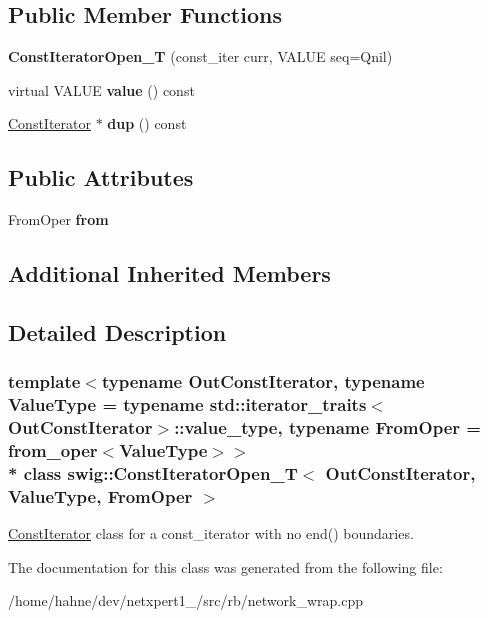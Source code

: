 \subsection*{Public Member Functions}
\begin{DoxyCompactItemize}
\item 
{\bfseries Const\+Iterator\+Open\+\_\+T} (const\+\_\+iter curr, V\+A\+L\+UE seq=Qnil)\hypertarget{classswig_1_1ConstIteratorOpen__T_a795c4ea10910b8ddd7d49113358b32b8}{}\label{classswig_1_1ConstIteratorOpen__T_a795c4ea10910b8ddd7d49113358b32b8}

\item 
virtual V\+A\+L\+UE {\bfseries value} () const \hypertarget{classswig_1_1ConstIteratorOpen__T_a56768ecfa74334e72f3acbb9b3e5b841}{}\label{classswig_1_1ConstIteratorOpen__T_a56768ecfa74334e72f3acbb9b3e5b841}

\item 
\hyperlink{structswig_1_1ConstIterator}{Const\+Iterator} $\ast$ {\bfseries dup} () const \hypertarget{classswig_1_1ConstIteratorOpen__T_abb8d229e1a739d4063e9e05a3f0df867}{}\label{classswig_1_1ConstIteratorOpen__T_abb8d229e1a739d4063e9e05a3f0df867}

\end{DoxyCompactItemize}
\subsection*{Public Attributes}
\begin{DoxyCompactItemize}
\item 
From\+Oper {\bfseries from}\hypertarget{classswig_1_1ConstIteratorOpen__T_ac5a104ae23e4a07d7fc86e4634d97735}{}\label{classswig_1_1ConstIteratorOpen__T_ac5a104ae23e4a07d7fc86e4634d97735}

\end{DoxyCompactItemize}
\subsection*{Additional Inherited Members}


\subsection{Detailed Description}
\subsubsection*{template$<$typename Out\+Const\+Iterator, typename Value\+Type = typename std\+::iterator\+\_\+traits$<$\+Out\+Const\+Iterator$>$\+::value\+\_\+type, typename From\+Oper = from\+\_\+oper$<$\+Value\+Type$>$$>$\\*
class swig\+::\+Const\+Iterator\+Open\+\_\+\+T$<$ Out\+Const\+Iterator, Value\+Type, From\+Oper $>$}

\hyperlink{structswig_1_1ConstIterator}{Const\+Iterator} class for a const\+\_\+iterator with no end() boundaries. 

The documentation for this class was generated from the following file\+:\begin{DoxyCompactItemize}
\item 
/home/hahne/dev/netxpert1\+\_/src/rb/network\+\_\+wrap.\+cpp\end{DoxyCompactItemize}
